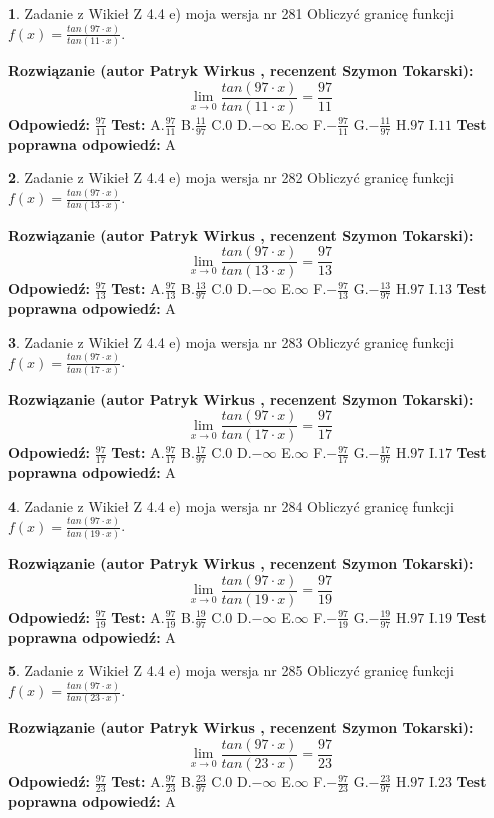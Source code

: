 \documentclass[12pt, a4paper]{article}
\theoremstyle{definition} %
\newtheorem{zad}{}
\newcommand{\zadStart}[1]{\begin{zad}#1\newline}
\newcommand{\zadStop}{\end{zad}}
\newcommand{\rozwStart}[2]{\noindent \textbf{Rozwiązanie (autor #1 , recenzent #2): }\newline}
\newcommand{\rozwStop}{\newline}
\newcommand{\odpStart}{\noindent \textbf{Odpowiedź:}\newline}
\newcommand{\odpStop}{\newline}
\newcommand{\testStart}{\noindent \textbf{Test:}\newline}
\newcommand{\testStop}{\newline}
\newcommand{\kluczStart}{\noindent \textbf{Test poprawna odpowiedź:}\newline}
\newcommand{\kluczStop}{\newline}
\begin{document}
\zadStart{Zadanie z Wikieł Z 4.4 e) moja wersja nr 281}
Obliczyć granicę funkcji $f(x)=\frac{tan(97\cdot x)}{tan(11\cdot x)}$.
\zadStop
\rozwStart{Patryk Wirkus}{Szymon Tokarski}
$$\lim\limits_{x\to 0}\frac{tan(97\cdot x)}{tan(11\cdot x)}=
\frac{97}{11}$$
\rozwStop
\odpStart
$\frac{97}{11}$
\odpStop
\testStart
A.$\frac{97}{11}$
B.$\frac{11}{97}$
C.$0$
D.$-\infty$
E.$\infty$
F.$-\frac{97}{11}$
G.$-\frac{11}{97}$
H.$97$
I.$11$
\testStop
\kluczStart
A
\kluczStop



\zadStart{Zadanie z Wikieł Z 4.4 e) moja wersja nr 282}
Obliczyć granicę funkcji $f(x)=\frac{tan(97\cdot x)}{tan(13\cdot x)}$.
\zadStop
\rozwStart{Patryk Wirkus}{Szymon Tokarski}
$$\lim\limits_{x\to 0}\frac{tan(97\cdot x)}{tan(13\cdot x)}=
\frac{97}{13}$$
\rozwStop
\odpStart
$\frac{97}{13}$
\odpStop
\testStart
A.$\frac{97}{13}$
B.$\frac{13}{97}$
C.$0$
D.$-\infty$
E.$\infty$
F.$-\frac{97}{13}$
G.$-\frac{13}{97}$
H.$97$
I.$13$
\testStop
\kluczStart
A
\kluczStop



\zadStart{Zadanie z Wikieł Z 4.4 e) moja wersja nr 283}
Obliczyć granicę funkcji $f(x)=\frac{tan(97\cdot x)}{tan(17\cdot x)}$.
\zadStop
\rozwStart{Patryk Wirkus}{Szymon Tokarski}
$$\lim\limits_{x\to 0}\frac{tan(97\cdot x)}{tan(17\cdot x)}=
\frac{97}{17}$$
\rozwStop
\odpStart
$\frac{97}{17}$
\odpStop
\testStart
A.$\frac{97}{17}$
B.$\frac{17}{97}$
C.$0$
D.$-\infty$
E.$\infty$
F.$-\frac{97}{17}$
G.$-\frac{17}{97}$
H.$97$
I.$17$
\testStop
\kluczStart
A
\kluczStop



\zadStart{Zadanie z Wikieł Z 4.4 e) moja wersja nr 284}
Obliczyć granicę funkcji $f(x)=\frac{tan(97\cdot x)}{tan(19\cdot x)}$.
\zadStop
\rozwStart{Patryk Wirkus}{Szymon Tokarski}
$$\lim\limits_{x\to 0}\frac{tan(97\cdot x)}{tan(19\cdot x)}=
\frac{97}{19}$$
\rozwStop
\odpStart
$\frac{97}{19}$
\odpStop
\testStart
A.$\frac{97}{19}$
B.$\frac{19}{97}$
C.$0$
D.$-\infty$
E.$\infty$
F.$-\frac{97}{19}$
G.$-\frac{19}{97}$
H.$97$
I.$19$
\testStop
\kluczStart
A
\kluczStop



\zadStart{Zadanie z Wikieł Z 4.4 e) moja wersja nr 285}
Obliczyć granicę funkcji $f(x)=\frac{tan(97\cdot x)}{tan(23\cdot x)}$.
\zadStop
\rozwStart{Patryk Wirkus}{Szymon Tokarski}
$$\lim\limits_{x\to 0}\frac{tan(97\cdot x)}{tan(23\cdot x)}=
\frac{97}{23}$$
\rozwStop
\odpStart
$\frac{97}{23}$
\odpStop
\testStart
A.$\frac{97}{23}$
B.$\frac{23}{97}$
C.$0$
D.$-\infty$
E.$\infty$
F.$-\frac{97}{23}$
G.$-\frac{23}{97}$
H.$97$
I.$23$
\testStop
\kluczStart
A
\kluczStop
\end{document}
